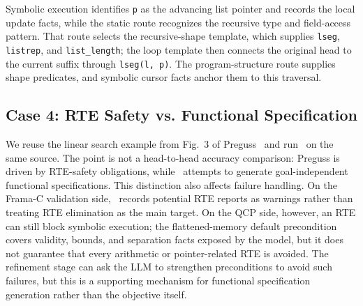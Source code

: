 Symbolic execution identifies \texttt{p} as the advancing list pointer and records the local update facts, while the static route recognizes the recursive type and field-access pattern. That route selects the recursive-shape template, which supplies \texttt{lseg}, \texttt{listrep}, and \texttt{list\_length}; the loop template then connects the original head to the current suffix through \texttt{lseg(l, p)}. The program-structure route supplies shape predicates, and symbolic cursor facts anchor them to this traversal.

\subsection{Case 4: RTE Safety vs. Functional Specification}
\label{app:case-search}

We reuse the linear search example from Fig.~3 of Preguss~\cite{Wang2025ATO} and run \toolname\ on the same source. The point is not a head-to-head accuracy comparison: Preguss is driven by RTE-safety obligations, while \toolname\ attempts to generate goal-independent functional specifications. This distinction also affects failure handling. On the Frama-C validation side, \toolname\ records potential RTE reports as warnings rather than treating RTE elimination as the main target. On the QCP side, however, an RTE can still block symbolic execution; the flattened-memory default precondition covers validity, bounds, and separation facts exposed by the model, but it does not guarantee that every arithmetic or pointer-related RTE is avoided. The refinement stage can ask the LLM to strengthen preconditions to avoid such failures, but this is a supporting mechanism for functional specification generation rather than the objective itself.

